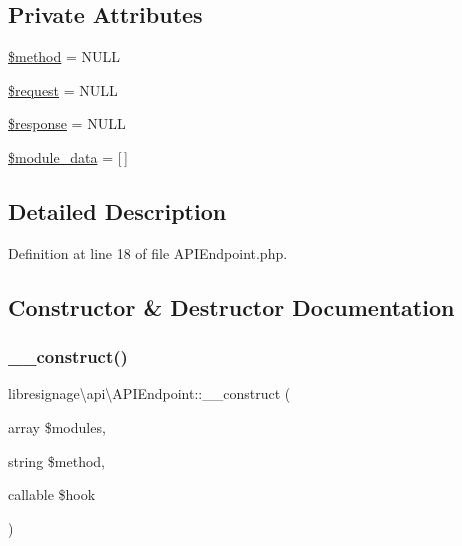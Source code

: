 \subsection*{Private Attributes}
\begin{DoxyCompactItemize}
\item 
\hyperlink{classlibresignage_1_1api_1_1APIEndpoint_aba5779c66d38280a31081a3a67453799}{\$method} = N\+U\+LL
\item 
\hyperlink{classlibresignage_1_1api_1_1APIEndpoint_a4d195d5200816fcff7a364ac1c86d1c5}{\$request} = N\+U\+LL
\item 
\hyperlink{classlibresignage_1_1api_1_1APIEndpoint_abfee89d0112c6f0bae18f4c872c9d3e6}{\$response} = N\+U\+LL
\item 
\hyperlink{classlibresignage_1_1api_1_1APIEndpoint_a19b0188cfff9a5a35df2944001f746e0}{\$module\+\_\+data} = \mbox{[}$\,$\mbox{]}
\end{DoxyCompactItemize}


\subsection{Detailed Description}


Definition at line 18 of file A\+P\+I\+Endpoint.\+php.



\subsection{Constructor \& Destructor Documentation}
\mbox{\label{classlibresignage_1_1api_1_1APIEndpoint_a4d3551a76b6477f65f7c3187be211cb3}} 
\subsubsection{\texorpdfstring{\+\_\+\+\_\+construct()}{\_\_construct()}}
{\footnotesize\ttfamily libresignage\textbackslash{}api\textbackslash{}\+A\+P\+I\+Endpoint\+::\+\_\+\+\_\+construct (\begin{DoxyParamCaption}\item[{array}]{\$modules,  }\item[{string}]{\$method,  }\item[{callable}]{\$hook }\end{DoxyParamCaption})}

